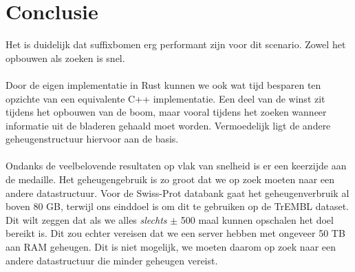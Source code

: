 \section{Conclusie}\label{sec:conclusie-suffix-bomen}
Het is duidelijk dat suffixbomen erg performant zijn voor dit scenario.
Zowel het opbouwen als zoeken is snel.
\\ \\
Door de eigen implementatie in Rust kunnen we ook wat tijd besparen ten opzichte van een equivalente C++ implementatie.
Een deel van de winst zit tijdens het opbouwen van de boom, maar vooral tijdens het zoeken wanneer informatie uit de bladeren gehaald moet worden.
Vermoedelijk ligt de andere geheugenstructuur hiervoor aan de basis.
\\ \\
Ondanks de veelbelovende resultaten op vlak van snelheid is er een keerzijde aan de medaille.
Het geheugengebruik is zo groot dat we op zoek moeten naar een andere datastructuur.
Voor de Swiss-Prot databank gaat het geheugenverbruik al boven 80 GB, terwijl ons einddoel is om dit te gebruiken op de TrEMBL dataset.
Dit wilt zeggen dat als we alles \textit{slechts} $\pm$ 500 maal kunnen opschalen het doel bereikt is.
Dit zou echter vereisen dat we een server hebben met ongeveer 50 TB aan RAM geheugen.
Dit is niet mogelijk, we moeten daarom op zoek naar een andere datastructuur die minder geheugen vereist.
